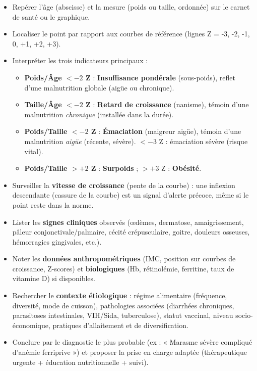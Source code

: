 \documentclass[11pt]{article}
\begin{document}
\begin{methode}
\begin{itemize}
  \item Repérer l'âge (abscisse) et la mesure (poids ou taille, ordonnée) sur le carnet de santé ou le graphique.
  \item Localiser le point par rapport aux courbes de référence (lignes Z = -3, -2, -1, 0, +1, +2, +3).
  \item Interpréter les trois indicateurs principaux :
    \begin{itemize}
      \item \textbf{Poids/Âge $<-2$ Z} : \textbf{Insuffisance pondérale} (sous-poids), reflet d'une malnutrition globale (aigüe ou chronique).
      \item \textbf{Taille/Âge $<-2$ Z} : \textbf{Retard de croissance} (nanisme), témoin d'une malnutrition \emph{chronique} (installée dans la durée).
      \item \textbf{Poids/Taille $<-2$ Z} : \textbf{Émaciation} (maigreur aigüe), témoin d'une malnutrition \emph{aigüe} (récente, sévère). $<-3$ Z : émaciation sévère (risque vital).
      \item \textbf{Poids/Taille $>+2$ Z} : \textbf{Surpoids} ; $>+3$ Z : \textbf{Obésité}.
    \end{itemize}
  \item Surveiller la \textbf{vitesse de croissance} (pente de la courbe) : une inflexion descendante (cassure de la courbe) est un signal d'alerte précoce, même si le point reste dans la norme.
\end{itemize}
\end{methode}

\begin{methode}
\begin{itemize}
  \item Lister les \textbf{signes cliniques} observés (œdèmes, dermatose, amaigrissement, pâleur conjonctivale/palmaire, cécité crépusculaire, goitre, douleurs osseuses, hémorragies gingivales, etc.).
  \item Noter les \textbf{données anthropométriques} (IMC, position sur courbes de croissance, Z-scores) et \textbf{biologiques} (Hb, rétinolémie, ferritine, taux de vitamine D) si disponibles.
  \item Rechercher le \textbf{contexte étiologique} : régime alimentaire (fréquence, diversité, mode de cuisson), pathologies associées (diarrhées chroniques, parasitoses intestinales, VIH/Sida, tuberculose), statut vaccinal, niveau socio-économique, pratiques d'allaitement et de diversification.
  \item Conclure par le diagnostic le plus probable (ex : « Marasme sévère compliqué d'anémie ferriprive ») et proposer la prise en charge adaptée (thérapeutique urgente + éducation nutritionnelle + suivi).
\end{itemize}
\end{methode}
\end{document}
